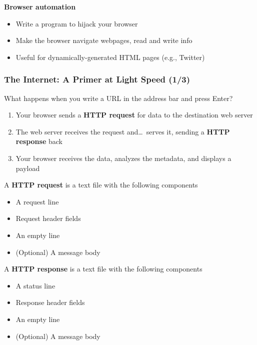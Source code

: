 \documentclass[10pt, aspectratio=1610, natbib, handout]{beamer}
\begin{document}
\begin{frame}
    \vfill\pause

    \textbf{Browser automation}  \hfill{}
      \begin{itemize}
        \item Write a program to hijack your browser
        \item Make the browser navigate webpages, read and write info
        \item Useful for dynamically-generated HTML pages (e.g., Twitter)
      \end{itemize}

  \end{frame}

  \begin{frame}
    \frametitle{The Internet: A Primer at Light Speed (1/3)}

    What happens when you write a URL in the address bar and press Enter?

    \begin{enumerate}
      \item Your browser sends a \textbf{HTTP request} for data to the destination web server
      \item The web server receives the request and\dots\ serves it, sending a \textbf{HTTP response} back
      \item Your browser receives the data, analyzes the metadata, and displays a payload
    \end{enumerate}

    \vfill\pause

    A \textbf{HTTP request} is a text file with the following components
    \begin{itemize}
      \item A request line
      \item Request header fields
      \item An empty line
      \item (Optional) A message body
    \end{itemize}

    \vfill\pause

    A \textbf{HTTP response} is a text file with the following components
    \begin{itemize}
      \item A status line
      \item Response header fields
      \item An empty line
      \item (Optional) A message body
    \end{itemize}

  \end{frame}
\end{document}
